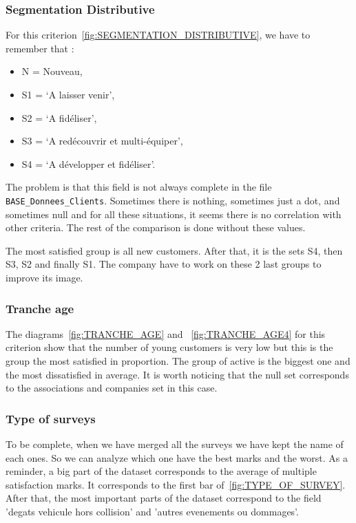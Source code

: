 \documentclass[a4paper, 11pt]{article}
\newcommand{\tw}[1]{\texttt{#1}}
\begin{document}
    \subsubsection{Segmentation Distributive}
    For this criterion~\ref{fig:SEGMENTATION_DISTRIBUTIVE}, we have to remember that :
    \begin{itemize}[noitemsep]
    \item N = Nouveau,
    \item S1 = `A laisser venir',
    \item S2 = `A fidéliser',
    \item S3 = `A redécouvrir et multi-équiper',
    \item S4 = `A développer et fidéliser'.
    \end{itemize}
    The problem is that this field is not always complete in the file \tw{BASE\_Donnees\_Clients}. Sometimes there is nothing, sometimes just a dot, and sometimes null and for all these situations, it seems there is no correlation with other criteria. The rest of the comparison is done without these values.
    
    The most satisfied group is all new customers. After that, it is the sets S4, then S3, S2 and finally S1. The company have to work on these 2 last groups to improve its image.
    
    \subsubsection{Tranche age}
    The diagrams~\ref{fig:TRANCHE_AGE} and ~\ref{fig:TRANCHE_AGE4} for this criterion show that the number of young customers is very low but this is the group the most satisfied in proportion. The group of active is the biggest one and the most dissatisfied in average. It is worth noticing that the null set corresponds to the associations and companies set in this case.
    
    \subsubsection{Type of surveys}
    To be complete, when we have merged all the surveys we have kept the name of each ones. So we can analyze which one have the best marks and the worst. As a reminder, a big part of the dataset corresponds to the average of multiple satisfaction marks. It corresponds to the first bar of~\ref{fig:TYPE_OF_SURVEY}. After that, the most important parts of the dataset correspond to the field 'degats vehicule hors collision' and 'autres evenements ou dommages'.
    
\end{document}
